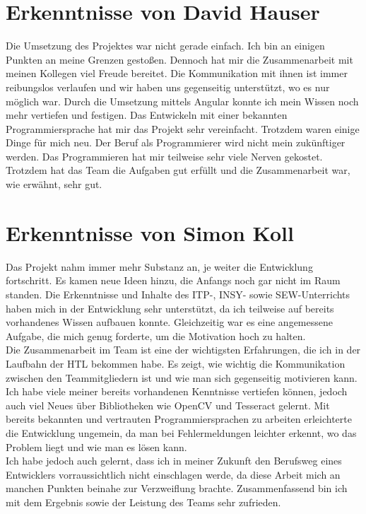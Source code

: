 \section{Erkenntnisse von David Hauser}
Die Umsetzung des Projektes war nicht gerade einfach. Ich bin an einigen Punkten an meine Grenzen gestoßen. Dennoch hat mir die Zusammenarbeit mit meinen Kollegen viel Freude bereitet. Die Kommunikation mit ihnen ist immer reibungslos verlaufen und wir haben uns gegenseitig unterstützt, wo es nur möglich war.
Durch die Umsetzung mittels Angular konnte ich mein Wissen noch mehr vertiefen und festigen. Das Entwickeln mit einer bekannten Programmiersprache hat mir das Projekt sehr vereinfacht. Trotzdem waren einige Dinge für mich neu.
Der Beruf als Programmierer wird nicht mein zukünftiger werden. Das Programmieren hat mir teilweise sehr viele Nerven gekostet. Trotzdem hat das Team die Aufgaben gut erfüllt und die Zusammenarbeit war, wie erwähnt, sehr gut.

\section{Erkenntnisse von Simon Koll}

Das Projekt nahm immer mehr Substanz an, je weiter die Entwicklung fortschritt. Es kamen neue Ideen hinzu, die Anfangs noch gar nicht im Raum standen. Die Erkenntnisse und Inhalte des ITP-, INSY- sowie SEW-Unterrichts haben mich in der Entwicklung sehr unterstützt, da ich teilweise auf bereits vorhandenes Wissen aufbauen konnte. Gleichzeitig war es eine angemessene Aufgabe, die mich genug forderte, um die Motivation hoch zu halten. \\
Die Zusammenarbeit im Team ist eine der wichtigsten Erfahrungen, die ich in der Laufbahn der HTL bekommen habe. Es zeigt, wie wichtig die Kommunikation zwischen den Teammitgliedern ist und wie man sich gegenseitig motivieren kann.\\
Ich habe viele meiner bereits vorhandenen Kenntnisse vertiefen können, jedoch auch viel Neues über Bibliotheken wie OpenCV und Tesseract gelernt. Mit bereits bekannten und vertrauten Programmiersprachen zu arbeiten erleichterte die Entwicklung ungemein, da man bei Fehlermeldungen leichter erkennt, wo das Problem liegt und wie man es lösen kann.\\
Ich habe jedoch auch gelernt, dass ich in meiner Zukunft den Berufsweg eines Entwicklers vorraussichtlich nicht einschlagen werde, da diese Arbeit mich an manchen Punkten beinahe zur Verzweiflung brachte.
Zusammenfassend bin ich mit dem Ergebnis sowie der Leistung des Teams sehr zufrieden. 